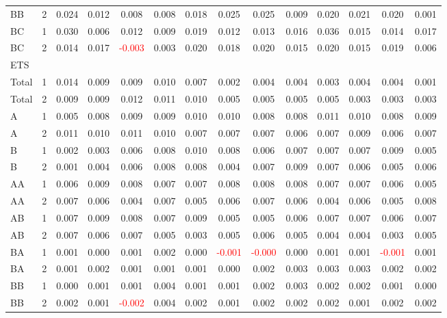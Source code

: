 \begin{table}[!htb]
{\begin{tabular}{llcccccccccccc}
BB & 2 & 0.024 & 0.012 & 0.008 & 0.008 & 0.018 & 0.025 & 0.025 & 0.009 & 0.020 & 0.021 & 0.020 & 0.001\\
BC & 1 & 0.030 & 0.006 & 0.012 & 0.009 & 0.019 & 0.012 & 0.013 & 0.016 & 0.036 & 0.015 & 0.014 & 0.017\\
BC & 2 & 0.014 & 0.017 & \textcolor{red}{-0.003} & 0.003 & 0.020 & 0.018 & 0.020 & 0.015 & 0.020 & 0.015 & 0.019 & 0.006\\
\hline
ETS &  &  &  &  &  &  &  &  &  &  &  &  & \\
\hline
Total & 1 & 0.014 & 0.009 & 0.009 & 0.010 & 0.007 & 0.002 & 0.004 & 0.004 & 0.003 & 0.004 & 0.004 & 0.001\\
Total & 2 & 0.009 & 0.009 & 0.012 & 0.011 & 0.010 & 0.005 & 0.005 & 0.005 & 0.005 & 0.003 & 0.003 & 0.003\\
A & 1 & 0.005 & 0.008 & 0.009 & 0.009 & 0.010 & 0.010 & 0.008 & 0.008 & 0.011 & 0.010 & 0.008 & 0.009\\
A & 2 & 0.011 & 0.010 & 0.011 & 0.010 & 0.007 & 0.007 & 0.007 & 0.006 & 0.007 & 0.009 & 0.006 & 0.007\\
B & 1 & 0.002 & 0.003 & 0.006 & 0.008 & 0.010 & 0.008 & 0.006 & 0.007 & 0.007 & 0.007 & 0.009 & 0.005\\
B & 2 & 0.001 & 0.004 & 0.006 & 0.008 & 0.008 & 0.004 & 0.007 & 0.009 & 0.007 & 0.006 & 0.005 & 0.006\\
AA & 1 & 0.006 & 0.009 & 0.008 & 0.007 & 0.007 & 0.008 & 0.008 & 0.008 & 0.007 & 0.007 & 0.006 & 0.005\\
AA & 2 & 0.007 & 0.006 & 0.004 & 0.007 & 0.005 & 0.006 & 0.007 & 0.006 & 0.004 & 0.006 & 0.005 & 0.008\\
AB & 1 & 0.007 & 0.009 & 0.008 & 0.007 & 0.009 & 0.005 & 0.005 & 0.006 & 0.007 & 0.007 & 0.006 & 0.007\\
AB & 2 & 0.007 & 0.006 & 0.007 & 0.005 & 0.003 & 0.005 & 0.006 & 0.005 & 0.004 & 0.004 & 0.003 & 0.005\\
BA & 1 & 0.001 & 0.000 & 0.001 & 0.002 & 0.000 & \textcolor{red}{-0.001} & \textcolor{red}{-0.000} & 0.000 & 0.001 & 0.001 & \textcolor{red}{-0.001} & 0.001\\
BA & 2 & 0.001 & 0.002 & 0.001 & 0.001 & 0.001 & 0.000 & 0.002 & 0.003 & 0.003 & 0.003 & 0.002 & 0.002\\
BB & 1 & 0.000 & 0.001 & 0.001 & 0.004 & 0.001 & 0.001 & 0.002 & 0.003 & 0.002 & 0.002 & 0.001 & 0.000\\
BB & 2 & 0.002 & 0.001 & \textcolor{red}{-0.002} & 0.004 & 0.002 & 0.001 & 0.002 & 0.002 & 0.002 & 0.001 & 0.002 & 0.002\\

\end{tabular}}
\end{table}
